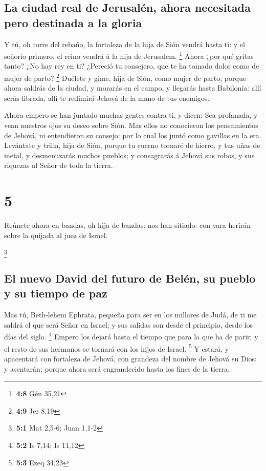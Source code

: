 \hypertarget{la-ciudad-real-de-jerusaluxe9n-ahora-necesitada-pero-destinada-a-la-gloria}{%
\subsection{La ciudad real de Jerusalén, ahora necesitada pero destinada
a la
gloria}\label{la-ciudad-real-de-jerusaluxe9n-ahora-necesitada-pero-destinada-a-la-gloria}}

 Y tú, oh torre del rebaño, la fortaleza de la hija de
Sión vendrá hasta ti: y el señorío primero, el reino vendrá á la hija de
Jerusalem. \footnote{\textbf{4:8} Gén 35,21}  Ahora ¿por
qué gritas tanto? ¿No hay rey en ti? ¿Pereció tu consejero, que te ha
tomado dolor como de mujer de parto? \footnote{\textbf{4:9} Jer 8,19}
 Duélete y gime, hija de Sión, como mujer de parto;
porque ahora saldrás de la ciudad, y morarás en el campo, y llegarás
hasta Babilonia: allí serás librada, allí te redimirá Jehová de la mano
de tus enemigos.

 Ahora empero se han juntado muchas gentes contra ti, y
dicen: Sea profanada, y vean nuestros ojos su deseo sobre Sión.
 Mas ellos no conocieron los pensamientos de Jehová, ni
entendieron su consejo: por lo cual los juntó como gavillas en la era.
 Levántate y trilla, hija de Sión, porque tu cuerno
tornaré de hierro, y tus uñas de metal, y desmenuzarás muchos pueblos; y
consagrarás á Jehová sus robos, y sus riquezas al Señor de toda la
tierra.

\hypertarget{section-4}{%
\section{5}\label{section-4}}

 Reúnete ahora en bandas, oh hija de bandas: nos han
sitiado: con vara herirán sobre la quijada al juez de Israel.

\footnote{\textbf{5:1} Mat 2,5-6; Juan 1,1-2}

\hypertarget{el-nuevo-david-del-futuro-de-beluxe9n-su-pueblo-y-su-tiempo-de-paz}{%
\subsection{El nuevo David del futuro de Belén, su pueblo y su tiempo de
paz}\label{el-nuevo-david-del-futuro-de-beluxe9n-su-pueblo-y-su-tiempo-de-paz}}

 Mas tú, Beth-lehem Ephrata, pequeña para ser en los
millares de Judá, de ti me saldrá el que será Señor en Israel; y sus
salidas son desde el principio, desde los días del siglo. \footnote{\textbf{5:2}
  Is 7,14; Is 11,12}  Empero los dejará hasta el tiempo
que para la que ha de parir; y el resto de sus hermanos se tornará con
los hijos de Israel. \footnote{\textbf{5:3} Ezeq 34,23}  Y
estará, y apacentará con fortaleza de Jehová, con grandeza del nombre de
Jehová su Dios: y asentarán; porque ahora será engrandecido hasta los
fines de la tierra.

